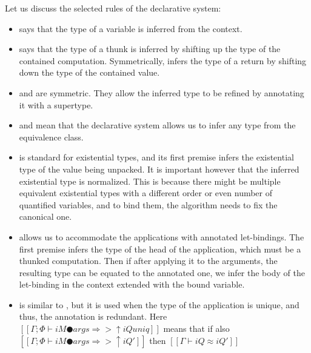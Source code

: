 \documentclass[acmsmall,natbib=false,review,anonymous]{acmart}
\begin{document}
Let us discuss the selected rules of the declarative system:
\begin{itemize}
  \item {}
    says that the type of a variable is inferred from the context.
  \item {} says
    that the type of a thunk is inferred by shifting up the type of the 
    contained computation. Symmetrically, 
    infers the type of a return by shifting down the type of the
    contained value.
  \item {} and  are symmetric.
    They allow the inferred type to be refined by annotating it with a supertype.
  \item {} and 
    mean that the declarative system allows us to infer any type from the equivalence class.
  \item {} is standard for existential types,
    and its first premise infers the existential type of the value being unpacked.
    It is important however that the inferred existential type is normalized. 
    This is because there might be multiple equivalent existential types 
    with a different order or even number of quantified variables, 
    and to bind them, the algorithm needs to fix the canonical one.
  \item {} allows us to accommodate the applications
    with annotated let-bindings. The first premise infers the type of the head of the application,
    which must be a thunked computation. Then if after applying it 
    to the arguments, the resulting type can be equated to the annotated one,
    we infer the body of the let-binding in the context extended with the bound variable.
  \item {} is similar to ,
    but it is used when the type of the application is unique, and thus, the annotation
    is redundant. Here $[[Γ ; Φ ⊢ iM ● args ⇒> ↑iQ uniq]]$ means that
    if also $[[Γ ; Φ ⊢ iM ● args ⇒> ↑iQ']]$ then $[[Γ ⊢ iQ ≈ iQ']]$
\end{itemize}
\end{document}
